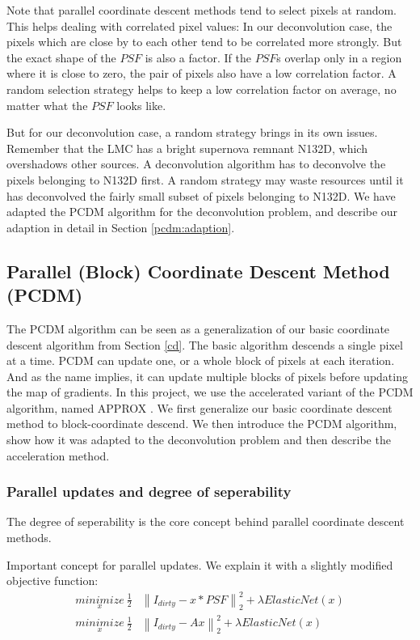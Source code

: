 Note that parallel coordinate descent methods tend to select pixels at random. This helps dealing with correlated pixel values: In our deconvolution case, the pixels which are close by to each other tend to be correlated more strongly. But the exact shape of the $PSF$ is also a factor. If the $PSF$s overlap only in a region where it is close to zero, the pair of pixels also have a low correlation factor. A random selection strategy helps to keep a low correlation factor on average, no matter what the $PSF$ looks like. 

But for our deconvolution case, a random strategy brings in its own issues. Remember that the LMC has a bright supernova remnant N132D, which overshadows other sources. A deconvolution algorithm has to deconvolve the pixels belonging to N132D first. A random strategy may waste resources until it has deconvolved the fairly small subset of pixels belonging to N132D. We have adapted the PCDM algorithm for the deconvolution problem, and describe our adaption in detail in Section  \ref{pcdm:adaption}.

\subsection{Parallel (Block) Coordinate Descent Method (PCDM)} \label{pcdm:pcdm}
The PCDM algorithm can be seen as a generalization of our basic coordinate descent algorithm from Section \ref{cd}. The basic algorithm descends a single pixel at a time. PCDM can update one, or a whole block of pixels at each iteration. And as the name implies, it can update multiple blocks of pixels before updating the map of gradients. In this project, we use the accelerated variant of the PCDM algorithm, named APPROX \cite{fercoq2015accelerated}. We first generalize our basic coordinate descent method to block-coordinate descend. We then introduce the PCDM algorithm, show how it was adapted to the deconvolution problem and then describe the acceleration method. 

\subsubsection{Parallel updates and degree of seperability}\label{pcdm:pcdm:degree}
The degree of seperability is the core concept behind parallel coordinate descent methods.

Important concept for parallel updates. We explain it with a slightly modified objective function:
\begin{equation}\label{pcdm:pcdm:degree:formula}
\begin{split}
\underset{x}{minimize} \: \frac{1}{2} &\left \| I_{dirty} -  x * PSF \right \|_2^2 + \lambda ElasticNet(x) \\
\underset{x}{minimize} \: \frac{1}{2} &\left \| I_{dirty} -  Ax \right \|_2^2 + \lambda ElasticNet(x)
\end{split}
\end{equation}


